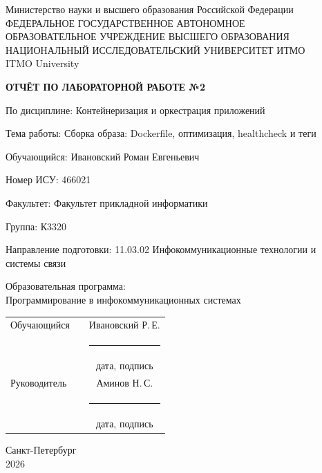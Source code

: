 \documentclass[14pt,a4paper,oneside]{extreport}
\newcommand{\LabNumber}{2}
\newcommand{\LabTitle}{Сборка образа: Dockerfile, оптимизация, healthcheck и теги}
\newcommand{\CourseName}{Контейнеризация и оркестрация приложений}
\newcommand{\StudentName}{Ивановский Роман Евгеньевич}
\newcommand{\StudentShortName}{Ивановский Р.\,Е.}
\newcommand{\StudentISU}{466021}
\newcommand{\StudentGroup}{К3320}
\newcommand{\FacultyName}{Факультет прикладной информатики}
\newcommand{\DegreeProgramme}{11.03.02 Инфокоммуникационные технологии и системы связи}
\newcommand{\EducationProgramme}{Программирование в инфокоммуникационных системах}
\newcommand{\TeacherName}{Аминов Н.\,С.}
\newcommand{\ReportCity}{Санкт-Петербург}
\newcommand{\ReportYear}{2026}
\begin{document}
\begin{titlepage}
  \thispagestyle{empty}
  \begin{center}
    \fontsize{12pt}{16pt}\selectfont
    Министерство науки и высшего образования Российской Федерации\\[0.25\baselineskip]
    ФЕДЕРАЛЬНОЕ ГОСУДАРСТВЕННОЕ АВТОНОМНОЕ\\
    ОБРАЗОВАТЕЛЬНОЕ УЧРЕЖДЕНИЕ ВЫСШЕГО ОБРАЗОВАНИЯ\\[0.25\baselineskip]
    НАЦИОНАЛЬНЫЙ ИССЛЕДОВАТЕЛЬСКИЙ УНИВЕРСИТЕТ ИТМО\\
    ITMO University
  \end{center}
  \vspace{0.8\baselineskip}
  \begin{center}
    \textbf{ОТЧЁТ ПО ЛАБОРАТОРНОЙ РАБОТЕ №\LabNumber}
  \end{center}
  \vspace{0.4\baselineskip}
  \begingroup
  \setlength{\parindent}{0pt}
  По дисциплине: \CourseName\par\medskip
  Тема работы: \LabTitle\par\medskip
  Обучающийся: \StudentName\par\medskip
  Номер ИСУ: \StudentISU\par\medskip
  Факультет: \FacultyName\par\medskip
  Группа: \StudentGroup\par\medskip
  Направление подготовки: \DegreeProgramme\par\medskip
  Образовательная программа:\\\EducationProgramme\par
  \endgroup
  \vfill
  \begin{tabularx}{\textwidth}{@{}lXc@{}}
    Обучающийся & & \StudentShortName\\
    & & \rule{38mm}{0.4pt}\\[-0.25\baselineskip]
    & & {\fontsize{12pt}{14pt}\selectfont дата, подпись}\\[0.6\baselineskip]
    Руководитель & & \TeacherName\\
    & & \rule{38mm}{0.4pt}\\[-0.25\baselineskip]
    & & {\fontsize{12pt}{14pt}\selectfont дата, подпись}
  \end{tabularx}
  \vfill
  \begin{center}
    \ReportCity\\
    \ReportYear
  \end{center}
\end{titlepage}
\setcounter{page}{2}
\tableofcontents

\end{document}
